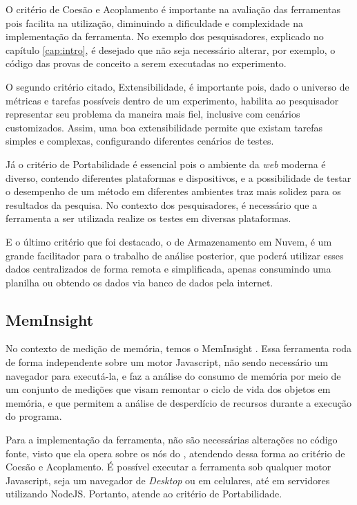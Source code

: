 \documentclass[12pt]{tcc}
\begin{document}
	O critério de Coesão e Acoplamento é importante na avaliação das ferramentas pois facilita na utilização, diminuindo a dificuldade e complexidade na implementação da ferramenta. No exemplo dos pesquisadores, explicado no capítulo \ref{cap:intro}, é desejado que não seja necessário alterar, por exemplo, o código das provas de conceito a serem executadas no experimento. 
	
	O segundo critério citado, Extensibilidade, é importante pois, dado o universo de métricas e tarefas possíveis dentro de um experimento, habilita ao pesquisador representar seu problema da maneira mais fiel, inclusive com cenários customizados. Assim, uma boa extensibilidade permite que existam tarefas simples e complexas, configurando diferentes cenários de testes.
	
	Já o critério de Portabilidade é essencial pois o ambiente da \emph{web} moderna é diverso, contendo diferentes plataformas e dispositivos, e a possibilidade de testar o desempenho de um método em diferentes ambientes traz mais solidez para os resultados da pesquisa. No contexto dos pesquisadores, é necessário que a ferramenta a ser utilizada realize os testes em diversas plataformas.
	
	E o último critério que foi destacado, o de Armazenamento em Nuvem, é um grande facilitador para o trabalho de análise posterior, que poderá utilizar esses dados centralizados de forma remota e simplificada, apenas consumindo uma planilha ou obtendo os dados via banco de dados pela internet.

	\subsection{MemInsight}
	\label{subsection:meminsight}

	No contexto de medição de memória, temos o MemInsight \citep{Jensen2015MemInsight}. Essa ferramenta roda de forma independente sobre um motor Javascript, não sendo necessário um navegador para executá-la, e faz a análise do consumo de memória por meio de um conjunto de medições que visam remontar o ciclo de vida dos objetos em memória, e que permitem a análise de desperdício de recursos durante a execução do programa. 

	Para a implementação da ferramenta, não são necessárias alterações no código fonte, visto que ela opera sobre os nós do , atendendo dessa forma ao critério de Coesão e Acoplamento. É possível executar a ferramenta sob qualquer motor Javascript, seja um navegador de \emph{Desktop} ou em celulares, até em servidores utilizando NodeJS. Portanto, atende ao critério de Portabilidade.
\end{document}
